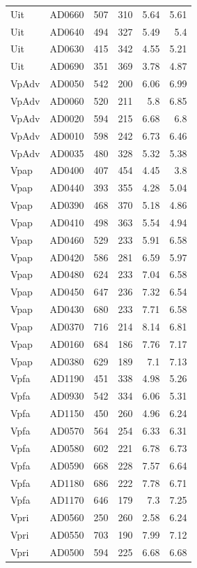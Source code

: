 \documentclass[article,10pt,microtype]{article}
\begin{document}
\begin{longtable}{llrrrr}
Uit & AD0660 & 507 & 310 & 5.64 & 5.61\\
Uit & AD0640 & 494 & 327 & 5.49 & 5.4\\
Uit & AD0630 & 415 & 342 & 4.55 & 5.21\\
Uit & AD0690 & 351 & 369 & 3.78 & 4.87\\
VpAdv & AD0050 & 542 & 200 & 6.06 & 6.99\\
VpAdv & AD0060 & 520 & 211 & 5.8 & 6.85\\
VpAdv & AD0020 & 594 & 215 & 6.68 & 6.8\\
VpAdv & AD0010 & 598 & 242 & 6.73 & 6.46\\
VpAdv & AD0035 & 480 & 328 & 5.32 & 5.38\\
Vpap & AD0400 & 407 & 454 & 4.45 & 3.8\\
Vpap & AD0440 & 393 & 355 & 4.28 & 5.04\\
Vpap & AD0390 & 468 & 370 & 5.18 & 4.86\\
Vpap & AD0410 & 498 & 363 & 5.54 & 4.94\\
Vpap & AD0460 & 529 & 233 & 5.91 & 6.58\\
Vpap & AD0420 & 586 & 281 & 6.59 & 5.97\\
Vpap & AD0480 & 624 & 233 & 7.04 & 6.58\\
Vpap & AD0450 & 647 & 236 & 7.32 & 6.54\\
Vpap & AD0430 & 680 & 233 & 7.71 & 6.58\\
Vpap & AD0370 & 716 & 214 & 8.14 & 6.81\\
Vpap & AD0160 & 684 & 186 & 7.76 & 7.17\\
Vpap & AD0380 & 629 & 189 & 7.1 & 7.13\\
Vpfa & AD1190 & 451 & 338 & 4.98 & 5.26\\
Vpfa & AD0930 & 542 & 334 & 6.06 & 5.31\\
Vpfa & AD1150 & 450 & 260 & 4.96 & 6.24\\
Vpfa & AD0570 & 564 & 254 & 6.33 & 6.31\\
Vpfa & AD0580 & 602 & 221 & 6.78 & 6.73\\
Vpfa & AD0590 & 668 & 228 & 7.57 & 6.64\\
Vpfa & AD1180 & 686 & 222 & 7.78 & 6.71\\
Vpfa & AD1170 & 646 & 179 & 7.3 & 7.25\\
Vpri & AD0560 & 250 & 260 & 2.58 & 6.24\\
Vpri & AD0550 & 703 & 190 & 7.99 & 7.12\\
Vpri & AD0500 & 594 & 225 & 6.68 & 6.68\\

\end{longtable}
\end{document}
